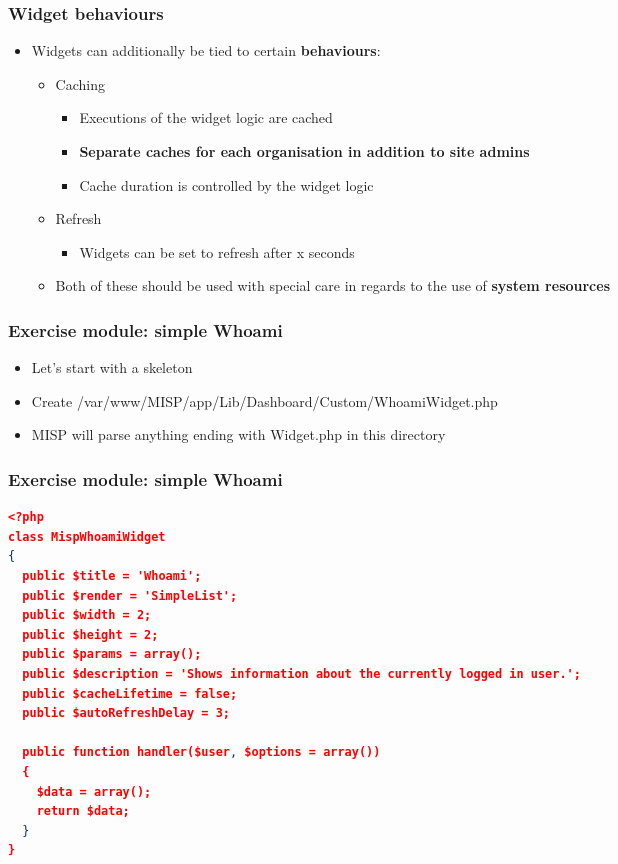 \begin{frame}
  \frametitle{Widget behaviours}
  \begin{itemize}
    \item Widgets can additionally be tied to certain {\bf behaviours}:
    \begin{itemize}
      \item Caching
      \begin{itemize}
        \item Executions of the widget logic are cached
        \item {\bf Separate caches for each organisation in addition to site admins}
        \item Cache duration is controlled by the widget logic
      \end{itemize}
      \item Refresh
      \begin{itemize}
        \item Widgets can be set to refresh after x seconds
      \end{itemize}
      \item Both of these should be used with special care in regards to the use of {\bf system resources}
    \end{itemize}
  \end{itemize}
\end{frame}

\begin{frame}
    \frametitle{Exercise module: simple Whoami}
    \begin{itemize}
        \item Let's start with a skeleton
        \item Create /var/www/MISP/app/Lib/Dashboard/Custom/WhoamiWidget.php
        \item MISP will parse anything ending with Widget.php in this directory
    \end{itemize}
\end{frame}

\begin{frame}[fragile]
    \frametitle{Exercise module: simple Whoami}
    \begin{adjustbox}{width=\textwidth,height=8cm,keepaspectratio}
        \begin{lstlisting}[language=json,firstnumber=1]
<?php
class MispWhoamiWidget
{
  public $title = 'Whoami';
  public $render = 'SimpleList';
  public $width = 2;
  public $height = 2;
  public $params = array();
  public $description = 'Shows information about the currently logged in user.';
  public $cacheLifetime = false;
  public $autoRefreshDelay = 3;

  public function handler($user, $options = array())
  {
    $data = array();
    return $data;
  }
}
        \end{lstlisting}
    \end{adjustbox}
\end{frame}


